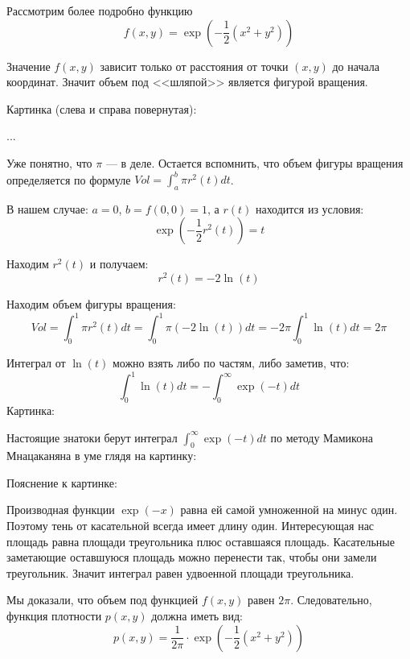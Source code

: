 Рассмотрим более подробно функцию
\begin{equation}
f(x,y)=\exp\left( -\frac{1}{2} (x^{2}+y^{2})\right)
\end{equation}

Значение $f(x,y)$ зависит только от расстояния от точки $(x,y)$ до начала координат. Значит объем под <<шляпой>> является фигурой вращения.

Картинка (слева и справа повернутая):

...

Уже понятно, что $\pi$ --- в деле. Остается вспомнить, что объем фигуры вращения определяется по формуле $Vol=\int_{a}^{b}\pi r^{2}(t)dt$.

В нашем случае: $a=0$, $b=f(0,0)=1$, а $r(t)$ находится из условия:
\begin{equation}
\exp\left( -\frac{1}{2} r^{2}(t)\right)=t
\end{equation}

Находим $r^{2}(t)$ и получаем:
\begin{equation}
r^{2}(t)=-2\ln(t)
\end{equation}

Находим объем фигуры вращения:
\begin{equation}
Vol=\int_{0}^{1} \pi r^{2}(t)dt=\int_{0}^{1} \pi (-2\ln(t))dt=-2\pi\int_{0}^{1}\ln(t)dt=2\pi 
\end{equation}

Интеграл от $\ln(t)$ можно взять либо по частям, либо заметив, что:
\begin{equation}
\int_{0}^{1}\ln(t)dt=-\int_{0}^{\infty}\exp(-t)dt
\end{equation}
Картинка:


Настоящие знатоки берут интеграл $\int_{0}^{\infty}\exp(-t)dt$ по методу Мамикона Мнацаканяна \cite{apostol:visual_calculus} в уме глядя на картинку:



Пояснение к картинке:

Производная функции $\exp(-x)$ равна ей самой умноженной на минус один. Поэтому тень от касательной всегда имеет длину один. Интересующая нас площадь равна площади треугольника плюс оставшаяся площадь. Касательные заметающие оставшуюся площадь можно перенести так, чтобы они замели треугольник. Значит интеграл равен удвоенной площади треугольника.

 
Мы доказали, что объем под функцией $f(x,y)$ равен $2\pi$. Следовательно, функция плотности $p(x,y)$ должна иметь вид:
\begin{equation}
p(x,y)=\frac{1}{2\pi}\cdot \exp\left( -\frac{1}{2} (x^{2}+y^{2})\right)
\end{equation}

